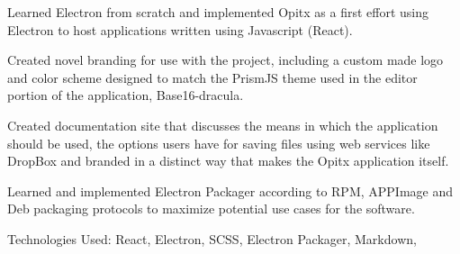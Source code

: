 \begin{cventries}
{\begin{cvitems}
        \item {Learned Electron from scratch and implemented Opitx as a first effort using Electron to host applications written using Javascript (React).}
        \item {Created novel branding for use with the project, including a custom made logo and color scheme designed to match the PrismJS theme used in the editor portion of the application, Base16-dracula.}
        \item {Created documentation site that discusses the means in which the application should be used, the options users have for saving files using web services like DropBox and branded in a distinct way that makes the Opitx application itself.}
        \item {Learned and implemented Electron Packager according to RPM, APPImage and Deb packaging protocols to maximize potential use cases for the software.}
        \item {Technologies Used: React, Electron, SCSS, Electron Packager, Markdown, }
      \end{cvitems}
    }

\end{cventries}

